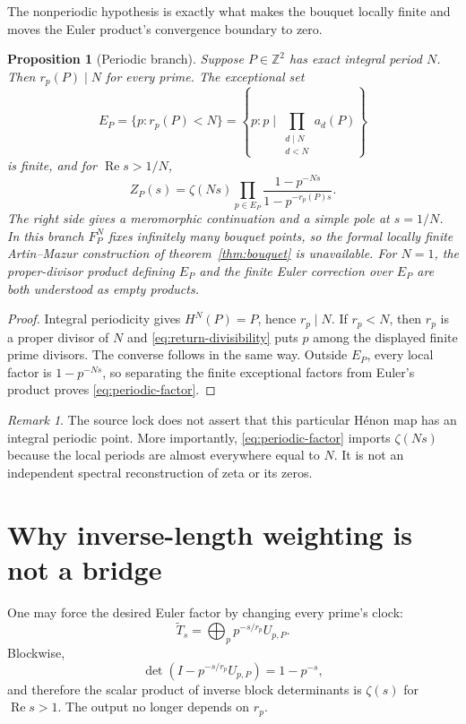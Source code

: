 \documentclass[11pt]{article}
\newtheorem{proposition}[theorem]{Proposition}
\theoremstyle{remark}
\newtheorem{remark}[theorem]{Remark}
\newcommand{\RePart}{\operatorname{Re}}
\newcommand{\Z}{\mathbb Z}
\begin{document}
The nonperiodic hypothesis is exactly what makes the bouquet locally finite
and moves the Euler product's convergence boundary to zero.

\begin{proposition}[Periodic branch]
\label{prop:periodic}
Suppose \(P\in\Z^2\) has exact integral period \(N\).  Then \(r_p(P)\mid N\)
for every prime.  The exceptional set
\[
 E_P=\{p:r_p(P)<N\}
 =\left\{p:p\mid
 \prod_{\substack{d\mid N\\d<N}}a_d(P)\right\}
\]
is finite, and for \(\RePart s>1/N\),
\[
 Z_P(s)=\zeta(Ns)
 \prod_{p\in E_P}
 \frac{1-p^{-Ns}}{1-p^{-r_p(P)s}}.
 \label{eq:periodic-factor}
\]
The right side gives a meromorphic continuation and a simple pole at
\(s=1/N\).  In this branch \(F_P^N\) fixes infinitely many bouquet points, so
the formal locally finite Artin--Mazur construction of
theorem~\ref{thm:bouquet} is unavailable.  For \(N=1\), the proper-divisor
product defining \(E_P\) and the finite Euler correction over \(E_P\) are both
understood as empty products.
\end{proposition}

\begin{proof}
Integral periodicity gives \(H^N(P)=P\), hence \(r_p\mid N\).  If \(r_p<N\),
then \(r_p\) is a proper divisor of \(N\) and
\eqref{eq:return-divisibility} puts \(p\) among the displayed finite prime
divisors.  The converse follows in the same way.  Outside \(E_P\), every
local factor is \(1-p^{-Ns}\), so separating the finite exceptional factors
from Euler's product proves \eqref{eq:periodic-factor}.
\end{proof}

\begin{remark}
The source lock does not assert that this particular H\'enon map has an
integral periodic point.  More importantly, \eqref{eq:periodic-factor}
imports \(\zeta(Ns)\) because the local periods are almost everywhere equal
to \(N\).  It is not an independent spectral reconstruction of zeta or its
zeros.
\end{remark}

\section{Why inverse-length weighting is not a bridge}

One may force the desired Euler factor by changing every prime's clock:
\[
 \widetilde T_s
 =\bigoplus_p p^{-s/r_p}U_{p,P}.
\]
Blockwise,
\[
 \det(I-p^{-s/r_p}U_{p,P})=1-p^{-s},
\]
and therefore the scalar product of inverse block determinants is
\(\zeta(s)\) for \(\RePart s>1\).  The output no longer depends on \(r_p\).
\end{document}
